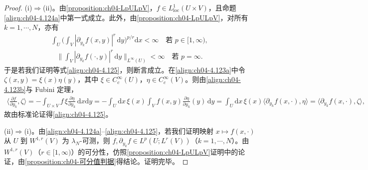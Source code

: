 \documentclass[../../main.tex]{subfiles}%
\begin{document}
\begin{proof}
(i)$\Rightarrow$(ii)。由\cref{proposition:ch04-LpULpV}，$f\in L^1_{\mathrm{loc}}(U\times V)$，且命题\eqref{align:ch04-4.124a}中第一式成立。此外，由\cref{proposition:ch04-LpULpV}，对所有 $k=1,\cdots ,N$，亦有
\begin{align*}
\int_U\Big(\int_V|\partial_{y_k}f(x,y)|^r\,\mathrm{d}y\Big)^{p/r}\mathrm{d}x<\infty\quad\text{若 }p\in[1,\infty),
\end{align*}
\begin{align*}
\Big\|\int_V|\partial_{y_k}f(\cdot,y)|^r\,\mathrm{d}y\Big\|_{L^\infty(U)}<\infty\quad\text{若 }p=\infty.
\end{align*}
于是若我们证明等式\eqref{align:ch04-4.125}，则断言成立。在\eqref{align:ch04-4.123a}中令 $\zeta(x,y)=\xi(x)\eta(y)$，其中 $\xi\in C_c^\infty(U)$，$\eta\in C_c^\infty(V)$。则由\eqref{align:ch04-4.123b}与 Fubini 定理，
\begin{align*}
\Big\langle\frac{\partial f}{\partial y_k},\zeta\Big\rangle
=-\int_{U\times V}f\,\xi\frac{\partial\eta}{\partial y_k}\,\mathrm{d}x\mathrm{d}y
=-\int_U\mathrm{d}x\,\xi(x)\int_V f(x,y)\frac{\partial\eta}{\partial y_k}(y)\,\mathrm{d}y
=\int_U\mathrm{d}x\,\xi(x)\langle\partial_{y_k}f(x,\cdot),\eta\rangle
=\langle\partial_{y_k}f(x,\cdot),\zeta\rangle,
\end{align*}
故由标准论证得\eqref{align:ch04-4.125}。

(ii)$\Rightarrow$(i)。由\eqref{align:ch04-4.124a}--\eqref{align:ch04-4.125}，若我们证明映射 $x\mapsto f(x,\cdot)$ 从 $U$ 到 $W^{1,r}(V)$ 为 $\lambda_N$-可测，则 $f,\partial_{y_k}f\in L^p(U;L^r(V))$（$k=1,\cdots ,N$）。由 $W^{1,r}(V)$（$r\in[1,\infty)$）的可分性，仿照\cref{proposition:ch04-LpULpV}证明中的论证，由\cref{proposition:ch04-可分值判据}得结论。证明完毕。
\end{proof}
\end{document}
